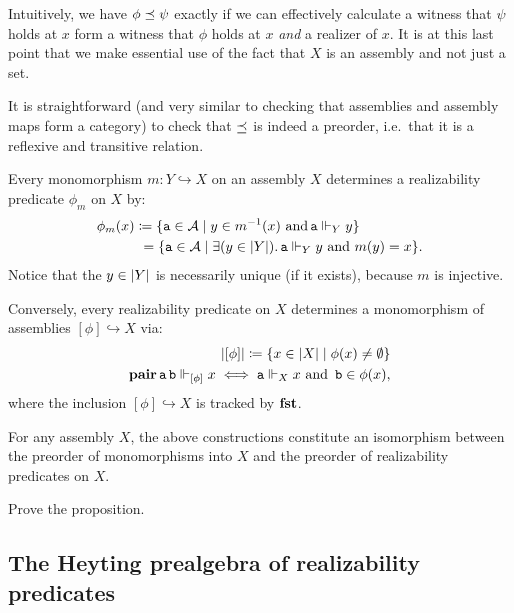 Intuitively, we have \(\phi \preceq \psi\) exactly if we can effectively
calculate a witness that \(\psi\) holds at \(x\) form a witness that \(\phi\)
holds at \(x\) \emph{and} a realizer of \(x\).
%
It is at this last point that we make essential use of the fact that \(X\) is an
assembly and not just a set.

%
It is straightforward (and very similar to checking that assemblies and assembly
maps form a category) to check that \(\preceq\) is indeed a preorder, i.e.\
that it is a reflexive and transitive relation.

Every monomorphism \(m \colon Y \hookrightarrow X\) on an assembly \(X\)
determines a realizability predicate \(\phi_m\) on \(X\) by:
\begin{align*}
  \phi_m(x) &\coloneqq
  \{\operatorname{\mathtt{a}} \in \mathcal A \mid y \in m^{-1}(x) \text{ and} \operatorname{\mathtt{a}} \Vdash_Y y\} \\
  &\hspace{3.5pt}=
  \{\operatorname{\mathtt{a}} \in \mathcal A \mid
    \exists(y \in \lvert Y\rvert).\operatorname{\mathtt{a}} \Vdash_Y y \text{ and } m(y) = x\}.
\end{align*}
%
Notice that the \(y \in \lvert Y\rvert\) is necessarily unique (if it exists),
because \(m\) is injective.

Conversely, every realizability predicate on \(X\) determines a monomorphism of
assemblies \([\phi] \hookrightarrow X\) via:
\begin{align*}
  \lvert[\phi]\rvert \coloneqq \{x \in \lvert X\rvert \mid \phi(x) \neq \emptyset\} \\
  \operatorname{\mathbf{pair}}\operatorname{\mathtt{a}}\operatorname{\mathtt{b}} \Vdash_{[\phi]} x
  \iff \operatorname{\mathtt{a}} \Vdash_X x
  \text{ and }
  \operatorname{\mathtt{b}} \in \phi(x),
\end{align*}
where the inclusion \([\phi] \hookrightarrow X\) is tracked by \(\operatorname{\mathbf{fst}}\).

\begin{proposition}\label{preorders-mono-predicates-iso}
  For any assembly \(X\), the above constructions constitute an isomorphism
  between the preorder of monomorphisms into \(X\) and the preorder of
  realizability predicates on \(X\).
\end{proposition}
\begin{exercise}\label{exer:preorders-monos-predicates-iso}
  Prove the proposition.
\end{exercise}


\subsection{The Heyting prealgebra of realizability predicates}%
\label{sec:Heyting-prealgebra-realizability-predicates}

